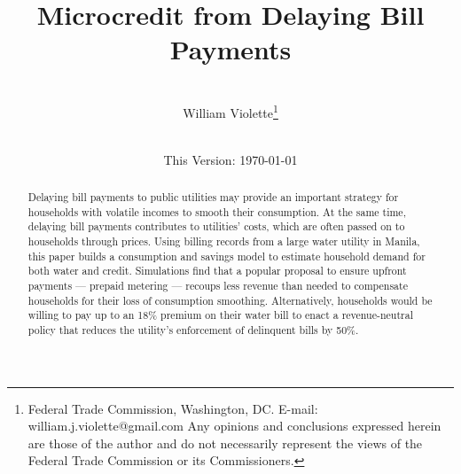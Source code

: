 \documentclass[12pt,table]{article}
\begin{document}
\begin{titlepage} 
\title{{Microcredit from Delaying Bill Payments}}
\author{\\[3em]
  William Violette\thanks{Federal Trade Commission, Washington, DC. E-mail: william.j.violette@gmail.com   Any opinions and conclusions expressed herein are those of the author and do not necessarily represent the views of the Federal Trade Commission or its Commissioners.} \\
 \\ 
  }
\vspace{30mm}
\date{\vspace{5mm}This Version: \today}
\maketitle
\begin{abstract}

Delaying bill payments to public utilities may provide an important strategy for households with volatile incomes to smooth their consumption.  At the same time, delaying bill payments contributes to utilities' costs, which are often passed on to households through prices.  Using billing records from a large water utility in Manila, this paper builds a consumption and savings model to estimate household demand for both water and credit.  Simulations find that a popular proposal to ensure upfront payments --- prepaid metering --- recoups less revenue than needed to compensate households for their loss of consumption smoothing.  Alternatively, households would be willing to pay up to an 18\% premium on their water bill to enact a revenue-neutral policy that reduces the utility's enforcement of delinquent bills by 50\%.













\end{abstract}
\end{titlepage}
\end{document}
